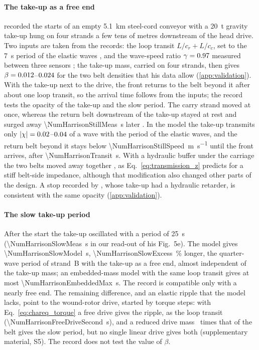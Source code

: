 \paragraph{The take-up as a free end}  recorded the starts
of an empty \qty{5.1}{\kilo\metre} steel-cord conveyor with a \qty{20}{\tonne} gravity take-up
hung on four strands a few tens of metres downstream of the head drive. Two inputs are taken
from the records: the loop transit $L/c_r+L/c_c$, set to the \qty{7}{\second} period of the
elastic waves \citep{harrison1983}, and the wave-speed ratio $\gamma=0.97$
measured between three sensors \citep[Fig.~4a]{harrison1985b}; the take-up mass, carried on four strands, then gives
$\beta=0.012$--$0.024$ for the two belt densities that his data allow
(\cref{app:validation}). With the take-up
next to the drive, the front returns to the belt beyond it after about one loop transit, so the
arrival time follows from the inputs; the record tests the opacity of the take-up and the slow
period. The carry strand moved
at once, whereas the return belt downstream of the take-up stayed at rest and surged away
\qty{\NumHarrisonStillMeas}{\second} later \citep[Fig.~2b]{harrison1985b}. In the model the
take-up transmits only $|\chi|=0.02$--$0.04$ of a
wave with the period of the elastic waves, and the return belt beyond it stays below
\qty{\NumHarrisonStillSpeed}{\metre\per\second} until the front arrives, after
\qty{\NumHarrisonTransit}{\second}. With a hydraulic buffer under the carriage the two belts
moved away together \citep[Fig.~3b]{harrison1985b}, as Eq.~\eqref{eq:transmission_z} predicts
for a stiff belt-side impedance, although that modification also changed other parts of the
design. A stop recorded by \citet{nordell1984}, whose take-up had a hydraulic retarder, is
consistent with the same opacity (\cref{app:validation}).

\paragraph{The slow take-up period} After the start the take-up oscillated with a period of
\qty{25}{\second} \citep{harrison1983} (\qty{\NumHarrisonSlowMeas}{\second} in our read-out of
his Fig.~5e). The model gives \qty{\NumHarrisonSlowModel}{\second},
\qty{\NumHarrisonSlowExcess}{\percent} longer, the quarter-wave period of strand~B with the
take-up as a free end, almost independent of the take-up mass; an embedded-mass model with the
same loop transit gives at most \qty{\NumHarrisonEmbeddedMax}{\second}. The record is
compatible only with a nearly free end. The remaining difference, and an elastic ripple that the
model lacks, point to the wound-rotor drive, started by torque steps: with Eq.~\eqref{eq:chareq_torque}
a free drive gives the ripple, as the loop transit (\qty{\NumHarrisonFreeDriveSecond}{\second}),
and a reduced drive mass \NumHarrisonDriveMassBeltRatio\ times that of the belt gives the slow
period, but no single linear drive gives both (supplementary material, S5). The record does not
test the value of $\beta$.


